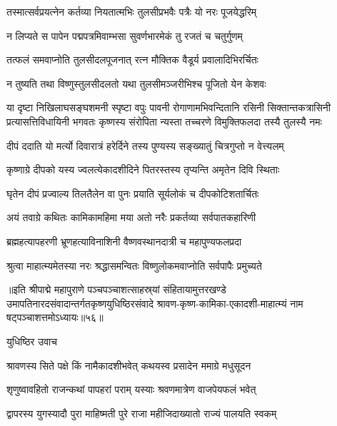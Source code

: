 \twolineshloka
{तस्मात्सर्वप्रयत्नेन कर्तव्या नियतात्मभिः}
{तुलसीप्रभवैः पत्रैः यो नरः पूजयेद्धरिम्}%

\twolineshloka
{न लिप्यते स पापेन पद्मपत्रमिवाम्भसा}
{सुवर्णभारमेकं तु रजतं च चतुर्गुणम्}%

\twolineshloka
{तत्फलं समवाप्नोति तुलसीदलपूजनात्}
{रत्न मौक्तिक वैडूर्य प्रवालादिभिरर्चितः}%

\twolineshloka
{न तुष्यति तथा विष्णुस्तुलसीदलतो यथा}
{तुलसीमञ्जरीभिश्च पूजितो येन केशवः}%

\fourlineindentedshloka
{या दृष्टा निखिलाघसङ्घशमनी स्पृष्टा वपुः पावनी}
{रोगाणामभिवन्दितानि रसिनी सिक्तान्तकत्रासिनी}
{प्रत्यासत्तिविधायिनी भगवतः कृष्णस्य संरोपिता}
{न्यस्ता तच्चरणे विमुक्तिफलदा तस्यै तुलस्यै नमः}%

\twolineshloka
{दीपं ददाति यो मर्त्यो दिवारात्रं हरेर्दिने}
{तस्य पुण्यस्य सङ्ख्यातुं चित्रगुप्तो न वेत्त्यलम्}%

\twolineshloka
{कृष्णाग्रे दीपको यस्य ज्वलत्येकादशीदिने}
{पितरस्तस्य तृप्यन्ति अमृतेन दिवि स्थिताः}%

\twolineshloka
{घृतेन दीपं प्रज्वाल्य तिलतैलेन वा पुनः}
{प्रयाति सूर्यलोकं च दीपकोटिशतार्चितः}%

\twolineshloka
{अयं तवाग्रे कथितः कामिकामहिमा मया}
{अतो नरैः प्रकर्तव्या सर्वपातकहारिणी}%

\twolineshloka
{ब्रह्महत्यापहरणी भ्रूणहत्याविनाशिनी}
{वैष्णवस्थानदात्री च महापुण्यफलप्रदा}%

\twolineshloka
{श्रुत्वा माहात्म्यमेतस्या नरः श्रद्धासमन्वितः}
{विष्णुलोकमवाप्नोति सर्वपापैः प्रमुच्यते}%

॥इति श्रीपाद्मे महापुराणे पञ्चपञ्चाशत्साहस्र्यां संहितायामुत्तरखण्डे उमापतिनारदसंवादान्तर्गतकृष्णयुधिष्ठिरसंवादे श्रावण-कृष्ण-कामिका-एकादशी-माहात्म्यं नाम षट्पञ्चाशत्तमोऽध्यायः॥५६॥


\hyperref[sec:ekadashi_mahatmyam_padma_puranam]{\closesub}
\clearpage

\label{sec:padma-shravana-shukla-putrada}

युधिष्ठिर उवाच

\twolineshloka
{श्रावणस्य सिते पक्षे किं नामैकादशीभवेत्}
{कथयस्व प्रसादेन ममाग्रे मधुसूदन}%


\twolineshloka
{शृणुष्वावहितो राजन्कथां पापहरां पराम्}
{यस्याः श्रवणमात्रेण वाजपेयफलं भवेत्}%

\twolineshloka
{द्वापरस्य युगस्यादौ पुरा माहिष्मती पुरे}
{राजा महीजिदाख्यातो राज्यं पालयति स्वकम्}%

